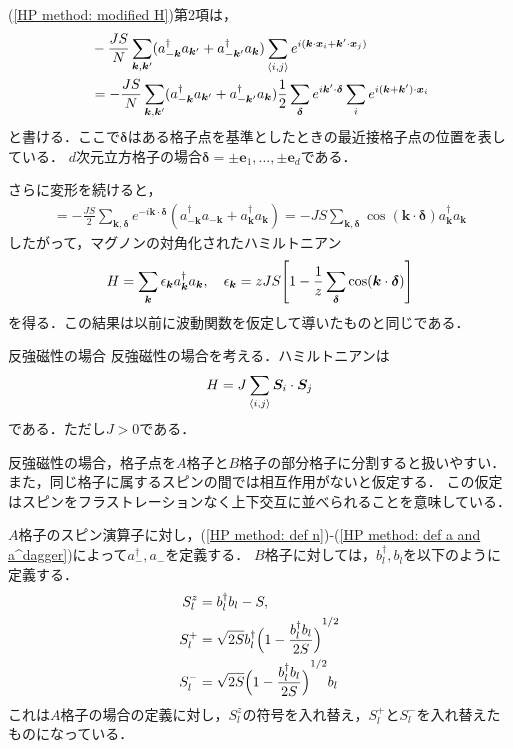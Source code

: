 \documentclass[dvipdfmx,9pt]{beamer}
\numberwithin{equation}{section}
\begin{document}
\begin{frame}
    (\ref{HP method: modified H})第2項は，
    \begin{align*}
        &
        -\frac{JS}{N} \sum_{\bm{k}, \bm{k}'} (a_{-\bm{k}}^\dagger a_{\bm{k}'} + a_{-\bm{k}'}^\dagger a_{\bm{k}}) 
        \sum_{\expval{i,j}}e^{i(\bm{k} \cdot \bm{x}_i + \bm{k}'\cdot \bm{x}_j)}
        \\ &
        = - \frac{JS}{N} \sum_{\bm{k}, \bm{k}'} (a_{-\bm{k}}^\dagger a_{\bm{k}'} + a_{-\bm{k}'}^\dagger a_{\bm{k}})
        \frac{1}{2}\sum_{\bm{\delta}}e^{i \bm{k}' \cdot \bm{\delta}} \sum_{i}e^{i(\bm{k} + \bm{k}')\cdot \bm{x}_i} 
    \end{align*}
    と書ける．ここで$\bm{\delta}$はある格子点を基準としたときの最近接格子点の位置を表している．
    $d$次元立方格子の場合$\bm{\delta} = \pm \bm{e}_1, \ldots, \pm \bm{e}_d$である．

    さらに変形を続けると，
    \begin{align}
        = - \frac{JS}{2} \sum_{\bm{k},\bm{\delta}}e^{-i \bm{k} \cdot \bm{\delta}}(a_{- \bm{k}}^\dagger a_{-\bm{k}} + a_{\bm{k}}^\dagger a_{\bm{k}})
        = -JS \sum_{\bm{k}, \bm{\delta}} \cos(\bm{k}\cdot \bm{\delta})  a_{\bm{k}}^\dagger a_{\bm{k}}
    \end{align}
    したがって，マグノンの対角化されたハミルトニアン
    \begin{align}
        H = \sum_{\bm{k}} \epsilon_{\bm{k}} a_{\bm{k}}^\dagger a_{\bm{k}},
        \quad
        \epsilon_{\bm{k}} = zJS\qty[1 - \frac{1}{z}\sum_{\bm{\delta}}\cos(\bm{k}\cdot \bm{\delta})]
    \end{align}
    を得る．この結果は以前に波動関数を仮定して導いたものと同じである．
\end{frame}

\begin{frame}{反強磁性の場合}
    反強磁性の場合を考える．ハミルトニアンは
    \begin{align}
        H = J \sum_{\expval{i,j}} \bm{S}_i \cdot \bm{S}_j
    \end{align}
    である．ただし$J > 0$である．

    反強磁性の場合，格子点を$A$格子と$B$格子の部分格子に分割すると扱いやすい．
    また，同じ格子に属するスピンの間では相互作用がないと仮定する．
    この仮定はスピンをフラストレーションなく上下交互に並べられることを意味している．
\end{frame}
\begin{frame}
    $A$格子のスピン演算子に対し，(\ref{HP method: def n})-(\ref{HP method: def a and a^dagger})によって$a_-^\dagger, a_-$を定義する．
    $B$格子に対しては，$b_l^\dagger, b_l$を以下のように定義する．
    \begin{align}
        S_l^z &= b_l^\dagger b_l - S,
        \\
        S_l^+ &= \sqrt{2S}b_l^\dagger \qty\Big(1-\frac{b_l^\dagger b_l}{2S})^{1/2}
        \\
        S_l^- &= \sqrt{2S} \qty\Big(1- \frac{b_l^\dagger b_l}{2S})^{1/2}b_l
    \end{align}
    これは$A$格子の場合の定義に対し，$S_l^z$の符号を入れ替え，$S_l^+$と$S_l^-$を入れ替えたものになっている．
\end{frame}
\end{document}
